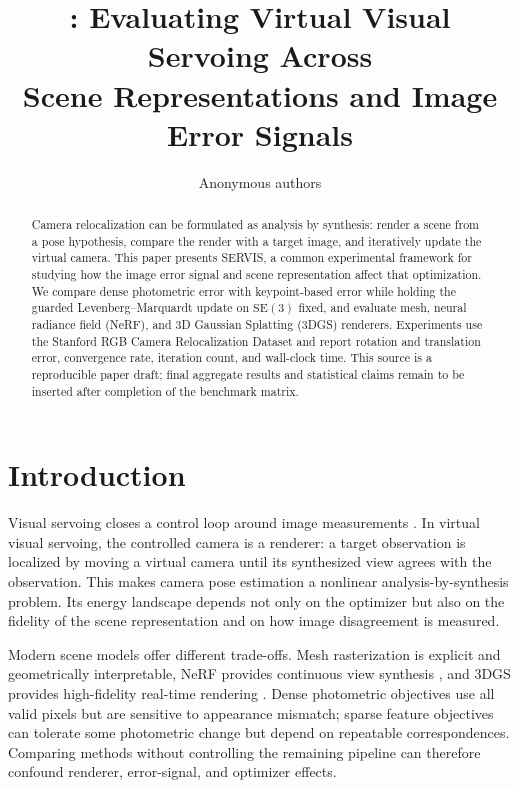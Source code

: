 \documentclass[10pt,twocolumn]{article}
\title{\method: Evaluating Virtual Visual Servoing Across\\
Scene Representations and Image Error Signals}
\author{Anonymous authors}
\date{}
\newcommand{\method}{\textsc{SERVIS}}
\newcommand{\SEthree}{\mathrm{SE}(3)}
\begin{document}
\maketitle

\begin{abstract}
Camera relocalization can be formulated as analysis by synthesis: render a
scene from a pose hypothesis, compare the render with a target image, and
iteratively update the virtual camera. This paper presents \method, a common
experimental framework for studying how the image error signal and scene
representation affect that optimization. We compare dense photometric error
with keypoint-based error while holding the guarded Levenberg--Marquardt update
on $\SEthree$ fixed, and evaluate mesh, neural radiance field (NeRF), and 3D
Gaussian Splatting (3DGS) renderers. Experiments use the Stanford RGB Camera
Relocalization Dataset and report rotation and translation error, convergence
rate, iteration count, and wall-clock time. This source is a reproducible paper
draft; final aggregate results and statistical claims remain to be inserted
after completion of the benchmark matrix.
\end{abstract}

\section{Introduction}

Visual servoing closes a control loop around image measurements
\cite{hutchinson1996tutorial}. In virtual visual servoing, the controlled
camera is a renderer: a target observation is localized by moving a virtual
camera until its synthesized view agrees with the observation. This makes
camera pose estimation a nonlinear analysis-by-synthesis problem. Its energy
landscape depends not only on the optimizer but also on the fidelity of the
scene representation and on how image disagreement is measured.

Modern scene models offer different trade-offs. Mesh rasterization is explicit
and geometrically interpretable, NeRF provides continuous view synthesis
\cite{mildenhall2020nerf}, and 3DGS provides high-fidelity real-time rendering
\cite{kerbl20233d}. Dense photometric objectives use all valid pixels but are
sensitive to appearance mismatch; sparse feature objectives can tolerate some
photometric change but depend on repeatable correspondences. Comparing methods
without controlling the remaining pipeline can therefore confound renderer,
error-signal, and optimizer effects.
\end{document}
